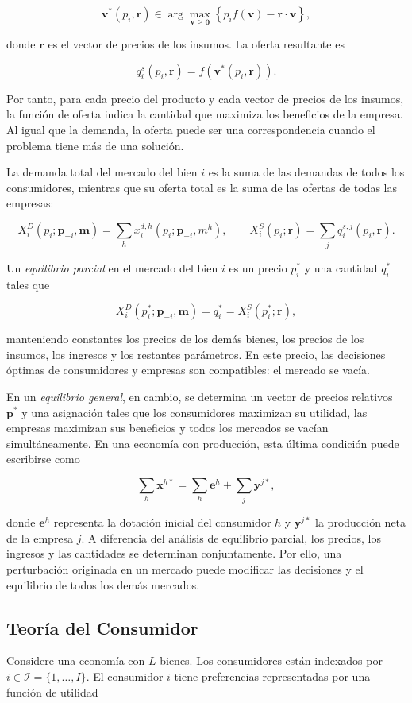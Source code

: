 \documentclass[12pt]{article}
\theoremstyle{cideplain}
\theoremstyle{cidedef}
\begin{document}
\[
\bm v^*(p_i,\bm r)
\in
\arg\max_{\bm v\geq\bm 0}
\left\{
p_i f(\bm v)-\bm r\cdot\bm v
\right\},
\]

donde $\bm r$ es el vector de precios de los insumos. La oferta
resultante es

\[
q_i^s(p_i,\bm r)
=
f\!\left(\bm v^*(p_i,\bm r)\right).
\]

Por tanto, para cada precio del producto y cada vector de precios de los
insumos, la función de oferta indica la cantidad que maximiza los
beneficios de la empresa. Al igual que la demanda, la oferta puede ser
una correspondencia cuando el problema tiene más de una solución.

La demanda total del mercado del bien $i$ es la suma de las demandas de
todos los consumidores, mientras que su oferta total es la suma de las
ofertas de todas las empresas:

\[
X_i^D(p_i;\bm p_{-i},\bm m)
=
\sum_h x_i^{d,h}(p_i;\bm p_{-i},m^h),
\qquad
X_i^S(p_i;\bm r)
=
\sum_j q_i^{s,j}(p_i,\bm r).
\]

Un \textit{equilibrio parcial} en el mercado del bien $i$ es un precio
$p_i^*$ y una cantidad $q_i^*$ tales que

\[
X_i^D(p_i^*;\bm p_{-i},\bm m)
=
q_i^*
=
X_i^S(p_i^*;\bm r),
\]

manteniendo constantes los precios de los demás bienes, los precios de
los insumos, los ingresos y los restantes parámetros. En este precio,
las decisiones óptimas de consumidores y empresas son compatibles: el
mercado se vacía.

En un \textit{equilibrio general}, en cambio, se determina un vector de
precios relativos $\bm p^*$ y una asignación tales que los consumidores
maximizan su utilidad, las empresas maximizan sus beneficios y todos los
mercados se vacían simultáneamente. En una economía con producción, esta
última condición puede escribirse como

\[
\sum_h \bm x^{h*}
=
\sum_h \bm e^h
+
\sum_j \bm y^{j*},
\]

donde $\bm e^h$ representa la dotación inicial del consumidor $h$ y
$\bm y^{j*}$ la producción neta de la empresa $j$. A diferencia del
análisis de equilibrio parcial, los precios, los ingresos y las
cantidades se determinan conjuntamente. Por ello, una perturbación
originada en un mercado puede modificar las decisiones y el equilibrio
de todos los demás mercados.

\subsection{Teoría del Consumidor}
Considere una economía con \(L\) bienes. Los consumidores están indexados por \(i\in\mathcal I=\{1,\ldots,I\}\). El consumidor \(i\) tiene preferencias representadas por una función de utilidad
\end{document}
